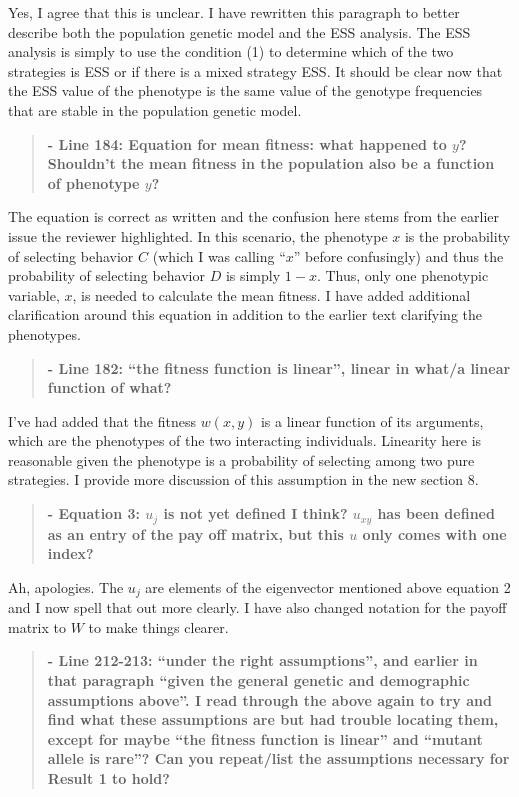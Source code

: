 \documentclass[10pt,parskip=full,foldmarks=off,addrfield=off,backaddress=false,refline=dateleft,letterpaper]{scrlttr2}
\newenvironment{reviewerquote}{\begin{quote}\color{DarkBlue}\bfseries}{\end{quote}}
\begin{document}
\begin{letter}
Yes, I agree that this is unclear. I have rewritten this paragraph to better describe both the population genetic model and the ESS analysis. The ESS analysis is simply to use the condition (1) to determine which of the two strategies is ESS or if there is a mixed strategy ESS. It should be clear now that the ESS value of the phenotype is the same value of the genotype frequencies that are stable in the population genetic model.

\begin{reviewerquote}
  - Line 184: Equation for mean fitness: what happened to $y$? Shouldn’t the mean fitness in the population also be a function of phenotype $y$?
\end{reviewerquote}

The equation is correct as written and the confusion here stems from the earlier issue the reviewer highlighted. In this scenario, the phenotype $x$ is the probability of selecting behavior $C$ (which I was calling ``$x$'' before confusingly) and thus the probability of selecting behavior $D$ is simply $1-x$. Thus, only one phenotypic variable, $x$, is needed to calculate the mean fitness. I have added additional clarification around this equation in addition to the earlier text clarifying the phenotypes.

\begin{reviewerquote}
  - Line 182: “the fitness function is linear”, linear in what/a linear function of what?
\end{reviewerquote}

I've had added that the fitness $w(x,y)$ is a linear function of its arguments, which are the phenotypes of the two interacting individuals. Linearity here is reasonable given the phenotype is a probability of selecting among two pure strategies. I provide more discussion of this assumption in the new section 8.

\begin{reviewerquote}
  - Equation 3: $u_j$ is not yet defined I think? $u_{xy}$ has been defined as an entry of the pay off matrix, but this $u$ only comes with one index?
\end{reviewerquote}

Ah, apologies. The $u_{j}$ are elements of the eigenvector mentioned above equation 2 and I now spell that out more clearly. I have also changed notation for the payoff matrix to $W$ to make things clearer.

\begin{reviewerquote}
  - Line 212-213: “under the right assumptions”, and earlier in that paragraph “given the general genetic and demographic assumptions above”. I read through the above again to try and find what these assumptions are but had trouble locating them, except for maybe “the fitness function is linear” and “mutant allele is rare”? Can you repeat/list the assumptions necessary for Result 1 to hold?
\end{reviewerquote}


\end{letter}
\end{document}
